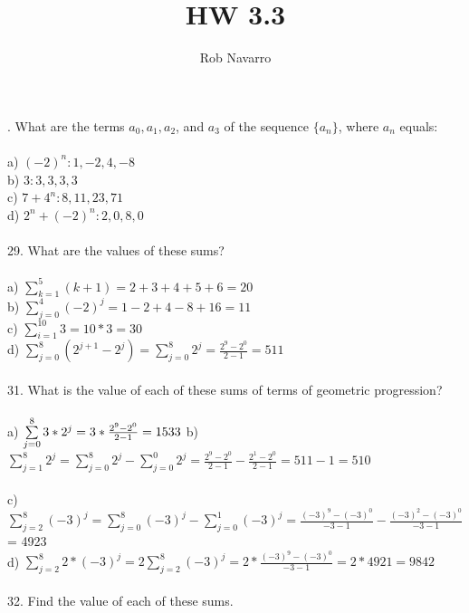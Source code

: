 \documentclass[11pt, oneside]{article}   	%
\title{HW 3.3 }
\author{Rob Navarro}
\begin{document}
\maketitle

. What are the terms $a_0, a_1, a_2$, and $a_3$ of the sequence $\{a_n\}$, where $a_n$ equals: \\\\
a) $(-2)^n: 1, -2, 4, -8$\\
b) $3: 3, 3, 3, 3$\\
c) $7 + 4^n: 8, 11, 23, 71$\\
d) $2^n + (-2)^n: 2, 0, 8, 0$\\\\
29. What are the values of these sums?\\\\
a) $\sum\limits_{k=1}^5 (k + 1) = 2 + 3 + 4 + 5 + 6 = 20$\\
b) $\sum\limits_{j=0}^4 (-2)^j = 1 - 2 + 4 - 8 + 16 = 11$\\
c) $\sum\limits_{i=1}^10 3 = 10 * 3 = 30$\\
d) $\sum\limits_{j=0}^8 (2^{j+1} - 2^j) = \sum\limits_{j=0}^8 2^j = \frac{2^9 - 2^0}{2 - 1} = 511$\\\\
31. What is the value of each of these sums of terms of geometric progression?\\\\
a) $\sum\limits_{j=0}^8 3 * 2^j = 3*\frac{2^9 - 2^0}{2 - 1}= 1533\\$
b) $\sum\limits_{j=1}^8 2^j = \sum\limits_{j=0}^8 2^j - \sum\limits_{j=0}^0 2^j = \frac{2^9 - 2^0}{2 - 1} - \frac{2^1 - 2^0}{2 - 1} = 511 - 1 = 510$\\\\
c) $\sum\limits_{j=2}^8 (-3)^j = \sum\limits_{j=0}^8 (-3)^j - \sum\limits_{j=0}^1 (-3)^j = \frac{(-3)^9 - (-3)^0}{-3 - 1} - \frac{(-3)^2 - (-3)^0}{-3 - 1}$ = 4923\\
d) $\sum\limits_{j=2}^8 2*(-3)^j = 2\sum\limits_{j=2}^8 (-3)^j = 2*\frac{(-3)^9 - (-3)^0}{-3 - 1} = 2 * 4921 = 9842$\\\\
32. Find the value of each of these sums.\\\\
\end{document}
